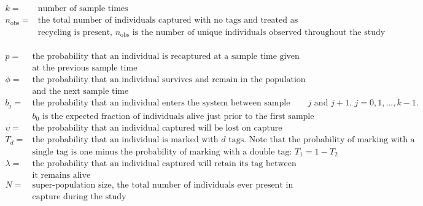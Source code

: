 \documentclass[]{article}
\begin{document}
\[
  \begin{array}{ll}
      k= & \text{number of sample times} \\
      n_{\text{obs}}= & \text{the total number of individuals captured with no tags and treated as new individuals; when no}\\
      & \text{recycling is present, $n_\text{obs}$ is the number of unique individuals observed throughout the study}\\
  \end{array}
\]

\[
  \begin{array}{ll}
      p= & \text{the probability that an individual is recaptured at a sample time given that the individual was alive}\\
      & \text{at the previous sample time} \\
      \phi=  & \text{the probability that an individual survives and remain in the population between a sample time}\\
      & \text{and the next sample time }\\
      b_j= & \text{the probability that an individual enters the system between sample times $j$ and $j+1$. $j=0,1,...,k-1$.}\\
       & \text{$b_0$ is the expected fraction of individuals alive just prior to the first sample time.}\\
      \upsilon= & \text{the probability that an individual captured will be lost on capture}\\
      T_d= & \text{the probability that an individual is marked with $d$ tags. Note that the probability of marking with a }\\
      & \text{single tag is one minus the probability of marking with a double tag: $T_1=1-T_2$}\\
      \lambda= & \text{the probability that an individual captured will  retain its tag between sample times  given that}\\
      & \text{it remains alive}\\
      N= & \text{super-population size, the total number of individuals ever present in population and available for}\\
      & \text{capture during the study}\\
  \end{array}
\]

\clearpage
\end{document}
